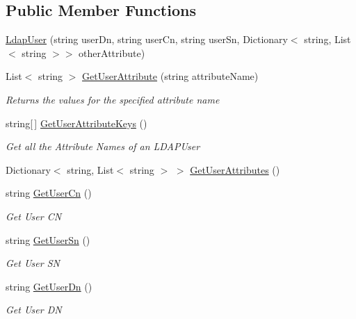 \subsection*{Public Member Functions}
\begin{DoxyCompactItemize}
\item 
\hyperlink{class_l_d_a_p_library_1_1_ldap_user_a8065af5b821d076abae045a671d1b094}{Ldap\+User} (string user\+Dn, string user\+Cn, string user\+Sn, Dictionary$<$ string, List$<$ string $>$$>$ other\+Attribute)
\item 
List$<$ string $>$ \hyperlink{class_l_d_a_p_library_1_1_ldap_user_a41049808080bacb94b5da7d06e53c27a}{Get\+User\+Attribute} (string attribute\+Name)
\begin{DoxyCompactList}\small\item\em Returns the values for the specified attribute name \end{DoxyCompactList}\item 
string\mbox{[}$\,$\mbox{]} \hyperlink{class_l_d_a_p_library_1_1_ldap_user_a780c387e3d7832377f54e5d442fd1aaf}{Get\+User\+Attribute\+Keys} ()
\begin{DoxyCompactList}\small\item\em Get all the Attribute Names of an L\+D\+A\+P\+User \end{DoxyCompactList}\item 
Dictionary$<$ string, List$<$ string $>$ $>$ \hyperlink{class_l_d_a_p_library_1_1_ldap_user_a41f1012228046179008d081aa57f9ef4}{Get\+User\+Attributes} ()
\item 
string \hyperlink{class_l_d_a_p_library_1_1_ldap_user_a5647b7d4dab052d102cc9a65e51cf923}{Get\+User\+Cn} ()
\begin{DoxyCompactList}\small\item\em Get User C\+N \end{DoxyCompactList}\item 
string \hyperlink{class_l_d_a_p_library_1_1_ldap_user_a02a1e6c71b41518fe5687c2442e58571}{Get\+User\+Sn} ()
\begin{DoxyCompactList}\small\item\em Get User S\+N \end{DoxyCompactList}\item 
string \hyperlink{class_l_d_a_p_library_1_1_ldap_user_af6a5669ed860bfbd98e0b687fc79afa0}{Get\+User\+Dn} ()
\begin{DoxyCompactList}\small\item\em Get User D\+N \end{DoxyCompactList}\item 
$$
\end{DoxyCompactItemize}
